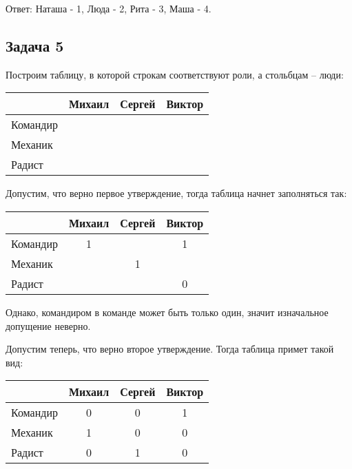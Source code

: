 Ответ: Наташа - 1, Люда - 2, Рита - 3, Маша - 4.

\subsection{Задача 5}
Построим таблицу, в которой строкам соответствуют роли, а стольбцам -- люди:

\rule{0cm}{0.3cm}

\begin{tabular}{|l|c|c|c|}
  \hline
           & Михаил & Сергей & Виктор \\ \hline
  Командир &        &        &        \\ \hline
  Механик  &        &        &        \\ \hline
  Радист   &        &        &        \\ \hline
\end{tabular}

\rule{0cm}{0.3cm}


Допустим, что верно первое утверждение, тогда таблица начнет заполняться так:

\rule{0cm}{0.3cm}

\begin{tabular}{|l|c|c|c|}
  \hline
           & Михаил & Сергей & Виктор \\ \hline
  Командир & 1      &        & 1      \\ \hline
  Механик  &        & 1      &        \\ \hline
  Радист   &        &        & 0      \\ \hline
\end{tabular}

\rule{0cm}{0.3cm}

Однако, командиром в команде может быть только один, значит изначальное допущение неверно.

Допустим теперь, что верно второе утверждение. Тогда таблица примет такой вид:

\rule{0cm}{0.3cm}

\begin{tabular}{|l|c|c|c|}
  \hline
           & Михаил & Сергей & Виктор \\ \hline
  Командир & 0      & 0      & 1      \\ \hline
  Механик  & 1      & 0      & 0      \\ \hline
  Радист   & 0      & 1      & 0      \\ \hline
\end{tabular}

